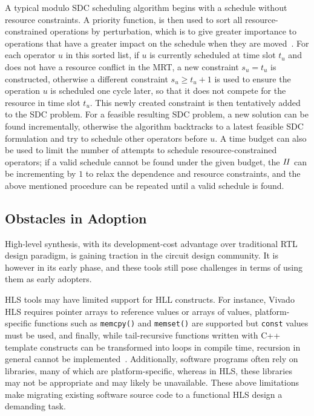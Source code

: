 A typical modulo SDC scheduling algorithm begins with a schedule without
resource constraints.  A priority function, is then used to sort all
resource-constrained operations by perturbation, which is to give greater
importance to operations that have a greater impact on the schedule when they
are moved~\cite{canis14}.  For each operator $u$ in this sorted list, if $u$ is
currently scheduled at time slot $t_u$ and does not have a resource conflict
in the MRT, a new constraint $s_u = t_u$ is constructed, otherwise a different
constraint $s_u \geq t_u + 1$ is used to ensure the operation $u$ is scheduled
one cycle later, so that it does not compete for the resource in time slot
$t_u$.  This newly created constraint is then tentatively added to the SDC
problem.  For a feasible resulting SDC problem, a new solution can be found
incrementally, otherwise the algorithm backtracks to a latest feasible SDC
formulation and try to schedule other operators before $u$.  A time budget can
also be used to limit the number of attempts to schedule resource-constrained
operators; if a valid schedule cannot be found under the given budget,
the $\mathit{II}$ can be incrementing by $1$ to relax the dependence and resource
constraints, and the above mentioned procedure can be repeated until a valid
schedule is found.


\subsection{Obstacles in Adoption}
\label{bg:sub:obstacles_in_adoption}

High-level synthesis, with its development-cost advantage over traditional RTL
design paradigm, is gaining traction in the circuit design community.  It is
however in its early phase, and these tools still pose challenges in terms of
using them as early adopters.

HLS tools may have limited support for HLL constructs.  For instance,
Vivado HLS requires pointer arrays to reference values or arrays of values,
platform-specific functions such as \verb|memcpy()| and \verb|memset()|
are supported but \verb|const| values must be used, and finally, while
tail-recursive functions written with C++ template constructs can be
transformed into loops in compile time, recursion in general cannot be
implemented~\cite{vivado_hls}.  Additionally, software programs often rely
on libraries, many of which are platform-specific, whereas in HLS\@, these
libraries may not be appropriate and may likely be unavailable.  These above
limitations make migrating existing software source code to a functional HLS
design a demanding task.

